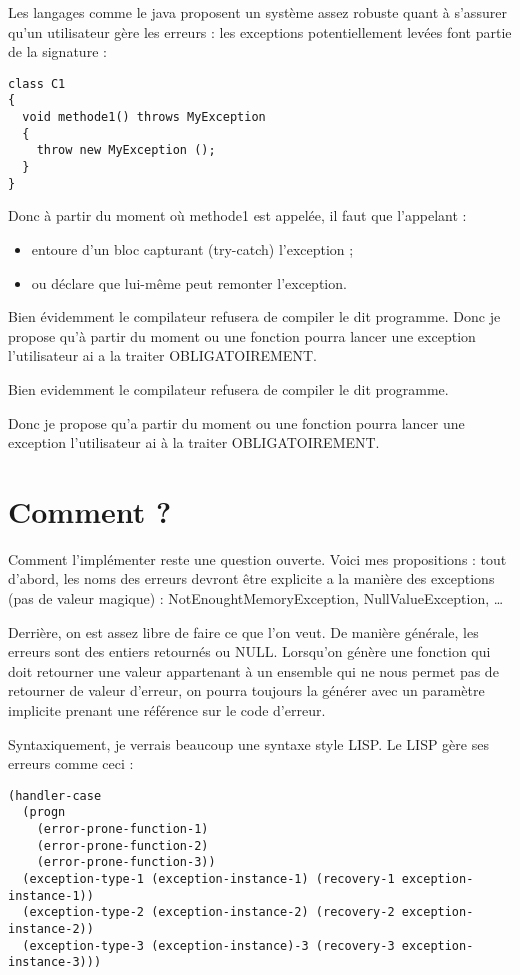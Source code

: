\documentclass{rtxreport}
\begin{document}
Les langages comme le java proposent un système assez robuste quant à s’assurer qu’un utilisateur gère les erreurs : les exceptions potentiellement levées font partie de la signature :

\lstset{language=java}
\begin{lstlisting}
class C1
{
  void methode1() throws MyException
  {
    throw new MyException ();
  }
}
\end{lstlisting}
\lstset{language=rathaxes}

Donc à partir du moment où methode1 est appelée, il faut que l’appelant : 
\begin{itemize}
	\item entoure d’un bloc capturant (try-catch) l’exception ; 
	\item ou déclare que lui-même peut remonter l’exception. 
\end{itemize}

Bien évidemment le compilateur refusera de compiler le dit programme. Donc je propose qu’à partir du moment ou une fonction pourra lancer une exception l’utilisateur ai a la traiter OBLIGATOIREMENT.

Bien evidemment le compilateur refusera de compiler le dit programme.

Donc je propose qu'a partir du moment ou une fonction pourra lancer une exception
l'utilisateur ai à la traiter OBLIGATOIREMENT.

\section{Comment ?}

Comment l’implémenter reste une question ouverte. Voici mes propositions : tout d’abord, les noms des erreurs devront être explicite a la manière des exceptions (pas de valeur magique) : NotEnoughtMemoryException, NullValueException, \ldots

Derrière, on est assez libre de faire ce que l’on veut. De manière générale, les erreurs sont des entiers retournés ou NULL. Lorsqu’on génère une fonction qui doit retourner une valeur appartenant à un ensemble qui ne nous permet pas de retourner de valeur d’erreur, on pourra toujours la générer avec un paramètre implicite prenant une référence sur le code d’erreur.

Syntaxiquement, je verrais beaucoup une syntaxe style LISP. Le LISP gère ses erreurs comme ceci :

\lstset{language=Lisp}
\begin{lstlisting}
(handler-case
  (progn
    (error-prone-function-1)
    (error-prone-function-2)
    (error-prone-function-3))
  (exception-type-1 (exception-instance-1) (recovery-1 exception-instance-1))
  (exception-type-2 (exception-instance-2) (recovery-2 exception-instance-2))
  (exception-type-3 (exception-instance)-3 (recovery-3 exception-instance-3)))
\end{lstlisting}
\end{document}
